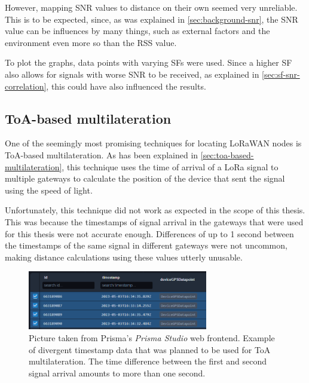 However, mapping \ac{SNR} values to distance on their own seemed very unreliable.
This is to be expected, since, as was explained in \cref{sec:background-snr}, the \ac{SNR} value can be influences by many things, such as external factors and the environment even more so than the \ac{RSS} value.

To plot the graphs, data points with varying \acp{SF} were used.
Since a higher \ac{SF} also allows for signals with worse \ac{SNR} to be received, as explained in \cref{sec:sf-snr-correlation}, this could have also influenced the results.

\subsection{\acf{ToA}-based multilateration}\label{subsec:toa-based-multilateration-implementation}

One of the seemingly most promising techniques for locating \ac{LoRaWAN} nodes is \ac{ToA}-based multilateration.
As has been explained in \cref{sec:toa-based-multilateration}, this technique uses the time of arrival of a \ac{LoRa} signal to multiple gateways to calculate the position of the device that sent the signal using the speed of light.

Unfortunately, this technique did not work as expected in the scope of this thesis.
This was because the timestamps of signal arrival in the gateways that were used for this thesis were not accurate enough.
Differences of up to 1 second between the timestamps of the same signal in different gateways were not uncommon, making distance calculations using these values utterly unusable.

\begin{figure}[htbp]
    \centering
    \includegraphics[width=0.7\textwidth]{pictures/multilateration/toa_bad_data_example_prisma_studio.png}
    \caption{
        Picture taken from Prisma's \emph{Prisma Studio} web frontend.
        Example of divergent timestamp data that was planned to be used for \ac{ToA} multilateration.
        The time difference between the first and second signal arrival amounts to more than one second.
    }\label{fig:toa-bad-data-example}
\end{figure}

